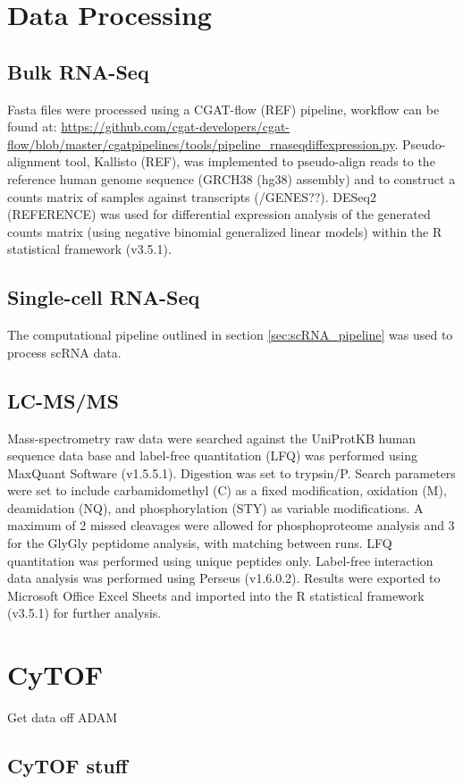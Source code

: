 \section{Data Processing}
\subsection{Bulk RNA-Seq}
Fasta files were processed using a CGAT-flow (REF) pipeline, workflow can be found at: \url{https://github.com/cgat-developers/cgat-flow/blob/master/cgatpipelines/tools/pipeline_rnaseqdiffexpression.py}. Pseudo-alignment tool, Kallisto (REF), was implemented to pseudo-align reads to the reference human genome sequence (GRCH38 (hg38) assembly) and to construct a counts matrix of samples against transcripts (/GENES??). DESeq2 (REFERENCE) was used for differential expression analysis of the generated  counts  matrix  (using  negative  binomial  generalized  linear  models) within the R statistical framework (v3.5.1).


\subsection{Single-cell RNA-Seq}
The computational pipeline outlined in section \ref{sec:scRNA_pipeline} was used to process scRNA data.

\subsection{LC-MS/MS}
Mass-spectrometry raw data were searched against the UniProtKB human sequence data base and label-free quantitation (LFQ) was performed using MaxQuant Software (v1.5.5.1). Digestion was set to trypsin/P. Search parameters were set to include carbamidomethyl (C) as a fixed modification, oxidation (M), deamidation (NQ), and phosphorylation (STY) as variable modifications. A maximum of 2 missed cleavages were allowed for phosphoproteome analysis and 3 for the GlyGly peptidome analysis, with matching between runs. LFQ quantitation was performed using unique peptides only. Label-free interaction data analysis was performed using Perseus (v1.6.0.2). Results were exported to Microsoft Office Excel Sheets and imported into the R statistical framework (v3.5.1) for further analysis.


\section{CyTOF}
Get data off ADAM
\subsection{CyTOF stuff}
